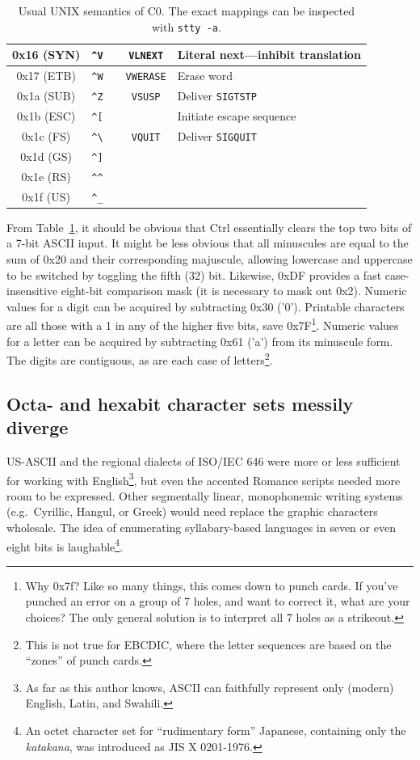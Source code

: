 \begin{table}[!htb]
\begin{tabular}{ |c|c|c|c|l| }
    \hline
    0x16 (SYN) & \texttt{\^{}V} & & \texttt{VLNEXT} & Literal next---inhibit translation\\
    \hline
    0x17 (ETB) & \texttt{\^{}W} & & \texttt{VWERASE} & Erase word \\
    \hline
    0x1a (SUB) & \texttt{\^{}Z} & & \texttt{VSUSP} & Deliver \texttt{SIGTSTP} \\
    \hline
    0x1b (ESC) & \texttt{\^{}[} & & & Initiate escape sequence \\
    \hline
    0x1c (FS) & \texttt{\^{}\textbackslash{}} & & \texttt{VQUIT} & Deliver \texttt{SIGQUIT} \\
    \hline
    0x1d (GS) & \texttt{\^{}]} & & & \\
    \hline
    0x1e (RS) & \texttt{\^{}\^{}} & & & \\
    \hline
    0x1f (US) & \texttt{\^{}\_} & & & \\
    \hline
  \end{tabular}
  \caption[Usual UNIX semantics of C0]{Usual UNIX semantics of C0. The exact mappings can be inspected with \texttt{stty -a}.}
  \label{table:c0maps}
\end{table}

From Table~\ref{table:c0maps}, it should be obvious that Ctrl essentially clears
the top two bits of a 7-bit ASCII input. It might be less obvious that all
minuscules are equal to the sum of 0x20 and their corresponding majuscule,
allowing lowercase and uppercase to be switched by toggling the fifth (32) bit.
Likewise, 0xDF provides a fast case-insensitive eight-bit comparison mask (it
is necessary to mask out 0x2). Numeric values
for a digit can be acquired by subtracting 0x30 ('0'). Printable characters are all
those with a 1 in any of the higher five bits, save 0x7F\footnote{Why 0x7f? Like
so many things, this comes down to punch cards. If you've punched an error on
a group of 7 holes, and want to correct it, what are your choices? The only
general solution is to interpret all 7 holes as a strikeout\cite{cardpunch}.}. Numeric values for a
letter can be acquired by subtracting 0x61 ('a') from its minuscule form. The
digits are contiguous, as are each case of letters\footnote{This is not true for
EBCDIC, where the letter sequences are based on the ``zones'' of punch cards\cite{nickgammon}.}.

\subsection{Octa- and hexabit character sets messily diverge}
US-ASCII and the regional dialects of ISO/IEC 646 were more or less sufficient
for working with English\footnote{As far as this author knows, ASCII
can faithfully represent only (modern) English, Latin, and Swahili.}, but even
the accented Romance scripts needed more room to be expressed. Other
segmentally linear, monophonemic writing systems (e.g.\ Cyrillic, Hangul, or
Greek) would need replace the graphic characters wholesale. The idea of
enumerating syllabary-based languages in seven or even eight bits is
laughable\footnote{An octet character set for ``rudimentary form'' Japanese,
containing only the \textit{katakana}, was introduced as JIS X 0201-1976.}.

